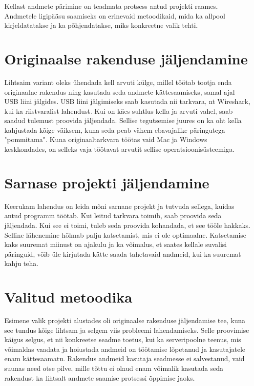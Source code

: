 Kellast andmete pärimine on teadmata protsess antud projekti raames.
Andmetele ligipääsu saamiseks on erinevaid metoodikaid, mida ka allpool kirjeldatatakse ja ka põhjendatakse, miks konkreetne valik tehti.


\section{Originaalse rakenduse jäljendamine}
Lihtsaim variant oleks ühendada kell arvuti külge, millel töötab tootja enda originaalne rakendus ning kasutada seda andmete kättesaamiseks, samal ajal USB liini jälgides.
USB liini jälgimiseks saab kasutada nii tarkvara, nt Wireshark, kui ka riistvaralist lahendust.
Kui on käes suhtlus kella ja arvuti vahel, saab saadud tulemust proovida jäljendada.
Sellise tegutsemise juures on ka oht kella kahjustada kõige väiksem, kuna seda peab vähem ebavajalike päringutega "pommitama".
Kuna originaaltarkvara töötas vaid Mac ja Windows keskkondades, on selleks vaja töötavat arvutit sellise operatsioonisüsteemiga.

\section{Sarnase projekti jäljendamine}
Keerukam lahendus on leida mõni sarnane projekt ja tutvuda sellega, kuidas antud programm töötab.
Kui leitud tarkvara toimib, saab proovida seda jäljendada.
Kui see ei toimi, tuleb seda proovida kohandada, et see tööle hakkaks.
Selline lähenemine hõlmab palju katsetamist, mis ei ole optimaalne.
Katsetamise kaks suuremat miinust on ajakulu ja ka võimalus, et saates kellale suvalisi päringuid, võib üle kirjutada kätte saada tahetavaid andmeid, kui ka suuremat kahju teha.

\section{Valitud metoodika}
Esimene valik projekti alustades oli originaalse rakenduse jäljendamise tee, kuna see tundus kõige lihtsam ja selgem viis probleemi lahendamiseks.
Selle proovimise käigus selgus, et nii konkreetse seadme toetus, kui ka serveripoolne teenus, mis võimaldas vaadata ja hoiustada andmeid on töötamise lõpetanud ja kasutajatele enam kättesaamatu.
Rakendus andmeid kasutaja seadmesse ei salvestanud, vaid suunas need otse pilve, mille tõttu ei olnud enam võimalik kasutada seda rakendust ka lihtsalt andmete saamise protsessi õppimise jaoks.


